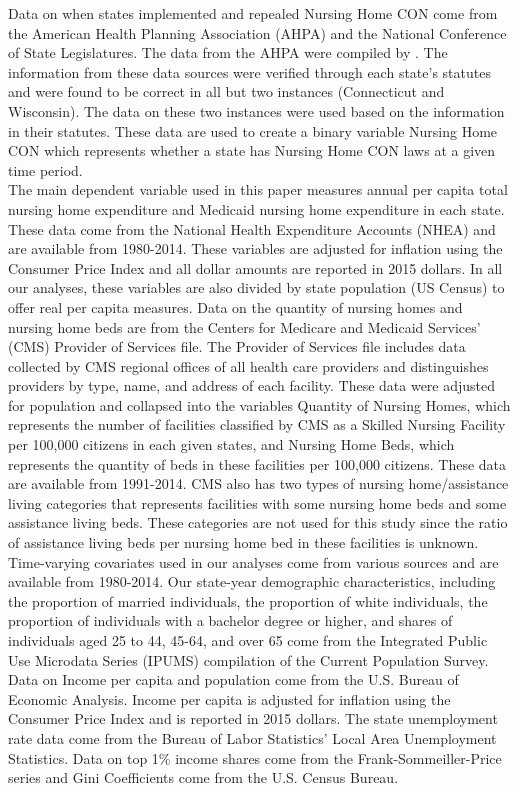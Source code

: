 \documentclass[../Main.tex]{subfiles}
\begin{document}
Data on when states implemented and repealed Nursing Home CON come from the American Health Planning Association (AHPA) and the National Conference of State Legislatures. The data from the AHPA were compiled by \citet{stratmann2014certificate}. The information from these data sources were verified through each state’s statutes and were found to be correct in all but two instances (Connecticut and Wisconsin). The data on these two instances were used based on the information in their statutes. These data are used to create a binary variable Nursing Home CON which represents whether a state has Nursing Home CON laws at a given time period.\\
\indent The main dependent variable used in this paper measures annual per capita total nursing home expenditure and Medicaid nursing home expenditure in each state. These data come from the National Health Expenditure Accounts (NHEA) and are available from 1980-2014. These variables are adjusted for inflation using the Consumer Price Index and all dollar amounts are reported in 2015 dollars. In all our analyses, these variables are also divided by state population (US Census) to offer real per capita measures. Data on the quantity of nursing homes and nursing home beds are from the Centers for Medicare and Medicaid Services’ (CMS) Provider of Services file. The Provider of Services file includes data collected by CMS regional offices of all health care providers and distinguishes providers by type, name, and address of each facility. These data were adjusted for population and collapsed into the variables Quantity of Nursing Homes, which represents the number of facilities classified by CMS as a Skilled Nursing Facility per 100,000 citizens in each given states, and Nursing Home Beds, which represents the quantity of beds in these facilities per 100,000 citizens. These data are available from 1991-2014. CMS also has two types of nursing home/assistance living categories that represents facilities with some nursing home beds and some assistance living beds. These categories are not used for this study since the ratio of assistance living beds per nursing home bed in these facilities is unknown. \\
\indent Time-varying covariates used in our analyses come from various sources and are available from 1980-2014. Our state-year demographic characteristics, including the proportion of married individuals, the proportion of white individuals, the proportion of individuals with a bachelor degree or higher, and shares of individuals aged 25 to 44, 45-64, and over 65 come from the Integrated Public Use Microdata Series (IPUMS) compilation of the Current Population Survey. Data on Income per capita and population come from the U.S. Bureau of Economic Analysis. Income per capita is adjusted for inflation using the Consumer Price Index and is reported in 2015 dollars. The state unemployment rate data come from the Bureau of Labor Statistics’ Local Area Unemployment Statistics. Data on top 1\% income shares come from the Frank-Sommeiller-Price series \citep{frank2015performance} and Gini Coefficients come from the U.S. Census Bureau.
\end{document}
